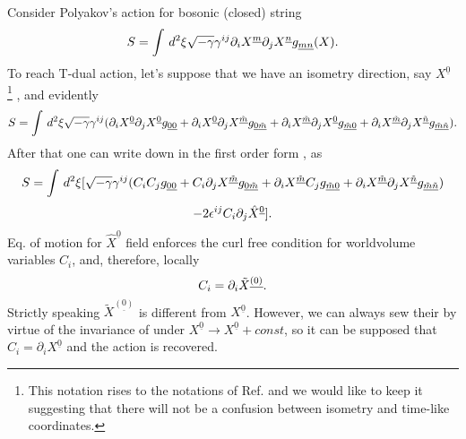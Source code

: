 \documentclass[a4paper,11pt]{article}
\begin{document}
Consider Polyakov's action for bosonic (closed) string \cite{polyakov}
\begin{equation}\plabel{SA}
S=\int\,d^2 \xi \sqrt{-\g}\g^{ij}\partial_i X^{\underline m}
\partial_j X^{\underline n}g_{\underline{mn}}(X).
\end{equation}
To reach T-dual action, let's suppose that we have an isometry direction,
say $X^{\underline{0}}$ 
\footnote{This notation rises to the notations of Ref. \cite{buscher} and 
we would like to keep it suggesting that there will not be a confusion between
isometry and time-like coordinates.}
, and evidently
\begin{equation}\plabel{SA1}
S=\int\,d^2 \xi \sqrt{-\g}\g^{ij}(\partial_i X^{\underline 0}
\partial_j X^{\underline 0}g_{\underline{00}}+
\partial_i X^{\underline 0}
\partial_j X^{\underline{\tilde m} }g_{\underline{0}\underline{\tilde m}}
+\partial_i X^{\underline{\tilde m} } \partial_j X^{\underline 0}
g_{\underline{\tilde m}\underline{0}}+
\partial_i X^{\underline{\tilde m} }\partial_j X^{\underline{\tilde n} }
g_{\underline{\tilde m}\underline{\tilde n}}).
\end{equation}
After that one can write down  in the first order form 
\cite{hklr}, \cite{ft} as
$$
S=\int\,d^2 \xi[
\sqrt{-\gamma}\gamma^{ij}(C_i C_j g_{\underline{00}}+ C_i \partial_j
X^{\underline{\tilde m}}g_{\underline{0}\underline{\tilde m}}
+\partial_i X^{\underline{\tilde m} } C_j g_{\underline{\tilde
m}\underline{0}}+
\partial_i X^{\underline{\tilde m} }\partial_j X^{\underline{\tilde n} }
g_{\underline{\tilde m}\underline{\tilde n}})
$$
\begin{eqnarray}\plabel{SA2}
-2\e^{ij}C_i \partial_j {\hat X}^{\underline{0}}].
\end{eqnarray}
Eq. of motion for ${\hat X}^{\underline{0}}$ field enforces the curl free
condition for worldvolume variables $C_i$, and, therefore, locally
\begin{equation}\plabel{A}
C_i=\partial_i {\tilde X}^{\underline{(0)}}.
\end{equation}
Strictly speaking ${\tilde X}^{\underline{(0)}}$ is different from
$X^{\underline{0}}$. However, we can always sew their by virtue of the
invariance of  under $X^{\underline{0}} \rightarrow X^{\underline{0}}
+const $, so it can be supposed that $C_i=\partial_i X^{\underline{0}}$
and the action  is recovered.
\end{document}
